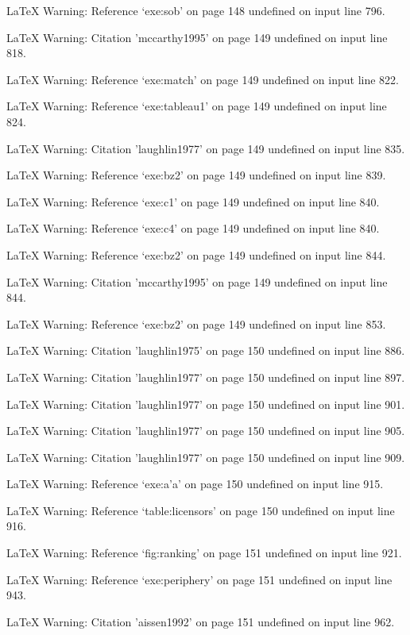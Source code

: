 LaTeX Warning: Reference `exe:sob' on page 148 undefined on input line 796.





LaTeX Warning: Citation 'mccarthy1995' on page 149 undefined on input line 818.


LaTeX Warning: Reference `exe:match' on page 149 undefined on input line 822.


LaTeX Warning: Reference `exe:tableau1' on page 149 undefined on input line 824.


LaTeX Warning: Citation 'laughlin1977' on page 149 undefined on input line 835.


LaTeX Warning: Reference `exe:bz2' on page 149 undefined on input line 839.


LaTeX Warning: Reference `exe:c1' on page 149 undefined on input line 840.


LaTeX Warning: Reference `exe:c4' on page 149 undefined on input line 840.


LaTeX Warning: Reference `exe:bz2' on page 149 undefined on input line 844.


LaTeX Warning: Citation 'mccarthy1995' on page 149 undefined on input line 844.


LaTeX Warning: Reference `exe:bz2' on page 149 undefined on input line 853.






LaTeX Warning: Citation 'laughlin1975' on page 150 undefined on input line 886.


LaTeX Warning: Citation 'laughlin1977' on page 150 undefined on input line 897.


LaTeX Warning: Citation 'laughlin1977' on page 150 undefined on input line 901.


LaTeX Warning: Citation 'laughlin1977' on page 150 undefined on input line 905.


LaTeX Warning: Citation 'laughlin1977' on page 150 undefined on input line 909.


LaTeX Warning: Reference `exe:a'a' on page 150 undefined on input line 915.


LaTeX Warning: Reference `table:licensors' on page 150 undefined on input line 916.


LaTeX Warning: Reference `fig:ranking' on page 151 undefined on input line 921.


LaTeX Warning: Reference `exe:periphery' on page 151 undefined on input line 943.


LaTeX Warning: Citation 'aissen1992' on page 151 undefined on input line 962.


